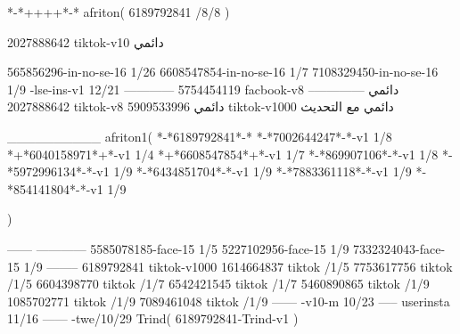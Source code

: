 *-*++++*-*
afriton(
6189792841 /8/8
)

2027888642 tiktok-v10
دائمي

565856296-in-no-se-16 1/26
6608547854-in-no-se-16 1/7
7108329450-in-no-se-16 1/9
-lse-ins-v1 12/21
------------
5754454119 facbook-v8
دائمي
--------------
2027888642 tiktok-v8
دائمي
5909533996 tiktok-v1000
دائمي مع التحديث

__________
afriton1(
*-*6189792841*-*
*-*7002644247*-*-v1 1/8
*+*6040158971*+*-v1 1/4
*+*6608547854*+*-v1 1/7
*-*869907106*-*-v1 1/8
*-*5972996134*-*-v1 1/9
*-*6434851704*-*-v1 1/9
*-*7883361118*-*-v1 1/9
*-*854141804*-*-v1 1/9

)

------
------------
5585078185-face-15 1/5
5227102956-face-15 1/9
7332324043-face-15 1/9
--------
6189792841 tiktok-v1000
1614664837 tiktok /1/5
7753617756 tiktok /1/5
6604398770 tiktok /1/7
6542421545 tiktok /1/7
5460890865 tiktok /1/9
1085702771 tiktok /1/9
7089461048 tiktok /1/9
------
-v10-m 10/23
-----
userinsta 11/16
------
-twe/10/29
Trind(
6189792841-Trind-v1 
)

